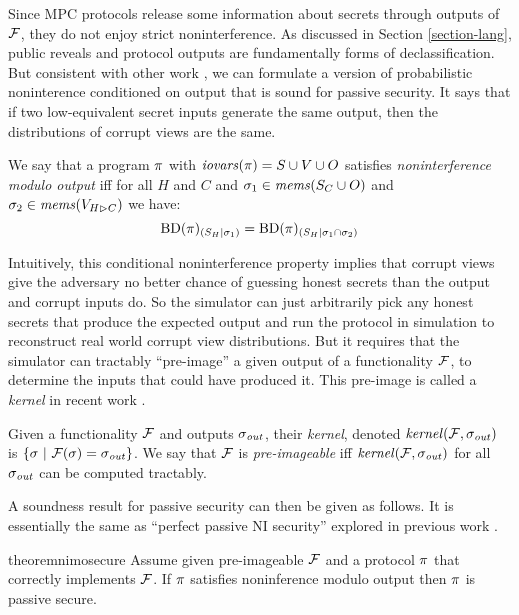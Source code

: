 Since MPC protocols release some information about secrets through
outputs of $\mathcal{F}$, they do not enjoy strict noninterference.  As
discussed in Section \ref{section-lang}, public reveals and protocol
outputs are fundamentally forms of declassification.  But consistent
with other work \cite{8429300}, we can formulate a version of
probabilistic noninterence conditioned on output that is sound
for passive security. It says that if two low-equivalent secret
inputs generate the same output, then the distributions of corrupt
views are the same. 
\begin{definition}
  \label{definition-NIMO}
  We say that a program $\pi$ with $\mathit{iovars}(\pi) = S \cup V \cup O$
  satisfies \emph{noninterference modulo output}
  iff for all $H$ and $C$ and $\sigma_1 \in \mathit{mems}(S_C \cup O)$ and $\sigma_2 \in \mathit{mems}(V_{H \rhd C})$
  we have:
  $$
  \mathrm{BD}(\pi)_{({S_H}|{\sigma_1})} = \mathrm{BD}(\pi)_{({S_H}|{\sigma_1 \cap \sigma_2})}
 $$
\end{definition}
Intuitively, this conditional noninterference property implies that
corrupt views give the adversary no better chance of guessing honest
secrets than the output and corrupt inputs do. So
the simulator can just arbitrarily pick any honest secrets that
produce the expected output and run the protocol in simulation to
reconstruct real world corrupt view distributions. But it requires
that the simulator can tractably ``pre-image'' a given output of
a functionality $\mathcal{F}$, to determine the inputs that
could have produced it. This pre-image is called a
\emph{kernel} in recent work \cite{XXX}.
\begin{definition}
  Given a functionality $\mathcal{F}$ and outputs $\sigma_{\mathit{out}}$, their 
  \emph{kernel}, denoted $\mathit{kernel}(\mathcal{F},\sigma_{\mathit{out}})$ is
  $
  \{ \sigma\ |\ \mathcal{F}(\sigma) = \sigma_{\mathit{out}} \}
  $.
  We say that $\mathcal{F}$ is \emph{pre-imageable} iff $\mathit{kernel}(\mathcal{F}, \sigma_{\mathit{out}})$ for all
  $\sigma_{\mathit{out}}$ can be computed tractably.
\end{definition}
A soundness result for passive security can then be given as follows.
It is essentially the same as ``perfect passive NI security'' explored
in previous work \cite{8429300}.  
\begin{restatable}{theorem}{nimosecure}
  \label{theorem-nimo}
  Assume given pre-imageable $\mathcal{F}$ and a protocol $\pi$ that
  correctly implements $\mathcal{F}$.  If $\pi$ satisfies noninference modulo output
  then $\pi$ is passive secure.
\end{restatable}


